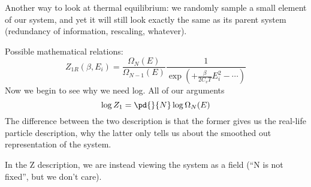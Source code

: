             Another way to look at thermal equilibrium:
            we randomly sample a small element of our system,
            and yet it will still look exactly the same
            as its parent system (redundancy of information, rescaling, whatever).

            Possible mathematical relations:
            \[Z_{1R}(\beta,E_i)  = \frac{\Omega_N(E)}{ \Omega_{N-1}(E)}
                             \frac1{\exp(+ \frac{\beta}{2C_v T}E_i^2
                                         - \cdots  )}\]
            Now we begin to see why we need log. All of our arguments
            \[\log Z_1 = \pd{}{N}\log \Omega_N(E)\]
            The difference between the two description is that
            the former gives us the real-life particle description,
            why the latter only tells us about the smoothed out representation of the system.

            In the Z description,
            we are instead viewing the system as a field (``N is not fixed'', but we don't care).\\


        


